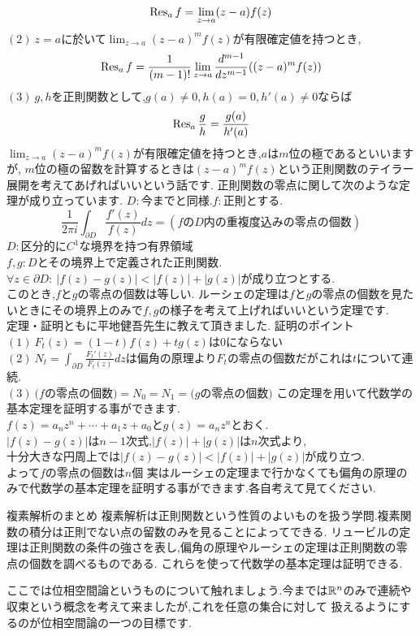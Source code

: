 \[
\mathop{\mathrm{Res}}\nolimits_{a} f = \lim_{z\to a} (z-a)f(z)
\]
$(2)\ z=a$に於いて$\lim_{z\to a} (z-a)^m f(z)$が有限確定値を持つとき,
\[
\mathop{\mathrm{Res}}\nolimits_{a} f = \frac{1}{(m-1)!} \lim_{z\to a} \frac{d^{m-1}}{dz^{m-1}} ((z-a)^mf(z))
\]
$(3)\ g,h$を正則関数として,$g(a)\neq 0,h(a)=0,h'(a)\neq 0$ならば
\[
\mathop{\mathrm{Res}}\nolimits_{a} \frac{g}{h} = \frac{g(a)}{h'(a)}
\]
\propx
$\lim_{z\to a} (z-a)^m f(z)$が有限確定値を持つとき,$a$は$m$位の極であるといいますが,
$m$位の極の留数を計算するときは$(z-a)^m f(z)$という正則関数のテイラー展開を考えてあげればいいという話です.
正則関数の零点に関して次のような定理が成り立っています.
\thm[偏角の原理]
$D:$今までと同様.$f:$正則とする.
\[
\frac{1}{2 \pi i} \int_{\partial D} \frac{f'(z)}{f(z)}dz = (f\mbox{の}D\mbox{内の重複度込みの零点の個数})
\]
\thmx
\thm[ルーシェの定理]
$D:$区分的に$C^1$な境界を持つ有界領域\\
$f,g:D$とその境界上で定義された正則関数.\\
$\forall z \in \partial D :\ |f(z)-g(z)|<|f(z)|+|g(z)|$が成り立つとする.\\
このとき,$f$と$g$の零点の個数は等しい.
\thmx
ルーシェの定理は$f$と$g$の零点の個数を見たいときにその境界上のみで$f,g$の様子を考えて上げればいいという定理です.
\proof
\leavevmode\\
定理・証明ともに平地健吾先生に教えて頂きました.
証明のポイント\\
$(1)\ F_t(z) = (1-t) f(z) + t g(z)$は$0$にならない\\
$(2)\ N_t=\int_{\partial D} \frac{F_t'(z)}{F_t(z)}dz$は偏角の原理より$F_t$の零点の個数だがこれは$t$について連続.\\
$(3)\ (f$の零点の個数$)=N_0=N_1=(g$の零点の個数$)$
\proofx
この定理を用いて代数学の基本定理を証明する事ができます.
\proof[ルーシェの定理を用いた代数学の基本定理の証明]
\leavevmode\\

$f(z)=a_n z^n + \cdots + a_1 z+ a_0$と$g(z)=a_n z^n$とおく.\\
$|f(z)-g(z)|$は$n-1$次式,$|f(z)|+|g(z)|$は$n$次式より,\\
十分大きな円周上では$|f(z)-g(z)|<|f(z)|+|g(z)|$が成り立つ.\\
よって$f$の零点の個数は$n$個
\proofx
\prob
実はルーシェの定理まで行かなくても偏角の原理のみで代数学の基本定理を証明する事ができます.各自考えて見てください.
\probx
\begin{itembox}[l]{複素解析のまとめ}
複素解析は正則関数という性質のよいものを扱う学問.複素関数の積分は正則でない点の留数のみを見ることによってできる.
リュービルの定理は正則関数の条件の強さを表し,偏角の原理やルーシェの定理は正則関数の零点の個数を調べるものである.
これらを使って代数学の基本定理は証明できる.
\end{itembox}
ここでは位相空間論というものについて触れましょう.今までは$\mathbb R^n$のみで連続や収束という概念を考えて来ましたが,これを任意の集合に対して
扱えるようにするのが位相空間論の一つの目標です.

